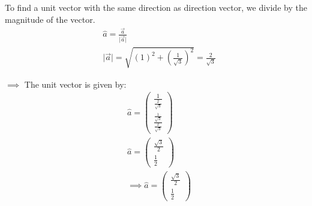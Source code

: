 \documentclass[12pt]{scrartcl}
\begin{document}
To find a unit vector with the same direction as direction vector, we divide by the magnitude of the vector.
 \begin{align*}
& \hat{a}  = \frac{\vec{a}}{\lvert \vec{a} \rvert}\\
& \lvert \vec{a} \rvert  = \sqrt{ \left( 1 \right)^{\!\!2} +  \left( \frac{1}{\sqrt{3}} \right)^{\!\!2}} = \frac{2}{\sqrt{3}}
\end{align*}

$\implies$ The unit vector is given by:
 \begin{align*}
& \hat{a}  = \begin{pmatrix} \frac{1}{\frac{2}{\sqrt{3}}} \\ \frac{\frac{1}{\sqrt{3}}}{\frac{2}{\sqrt{3}}} \end{pmatrix}\\
& \hat{a}  = \begin{pmatrix} \frac{\sqrt{3}}{2} \\ \frac{1}{2} \end{pmatrix}\\
& \implies \boxed{\hat{a}  = \begin{pmatrix} \frac{\sqrt{3}}{2} \\ \frac{1}{2} \end{pmatrix}}\\
\end{align*}
\end{document}
